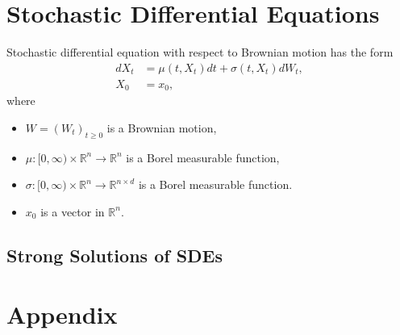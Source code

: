 \documentclass{report}
\theoremstyle{nonumberplain}
\begin{document}
\chapter{Stochastic Differential Equations}
Stochastic differential equation with respect to Brownian motion has the form
$$
\begin{aligned}
d X_t &=\mu\left(t, X_t\right) d t+\sigma\left(t, X_t\right) d W_t, \\
X_0 &=x_0,
\end{aligned}
$$
where
\begin{itemize}
	\item $W=\left(W_t\right)_{t\ge 0}$ is a Brownian motion,
	\item $\mu: [0,\infty) \times \mathbb{R}^n \rightarrow \mathbb{R}^n$ is a Borel measurable function,
	\item $\sigma: [0,\infty) \times \mathbb{R}^n \rightarrow \mathbb{R}^{n\times d}$ is a Borel measurable function.
	\item $x_0$ is a vector in $\mathbb{R}^n$.
\end{itemize}
\section{Strong Solutions of SDEs}
\newpage

\chapter*{Appendix}
\end{document}
